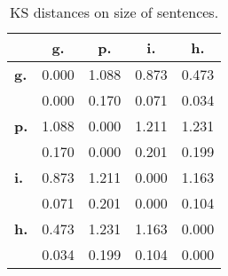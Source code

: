 \begin{table}[h!]
\begin{center}
\begin{tabular}{| l || c | c | c | c |}\hline
 & {\bf g.} & {\bf p.} & {\bf i.} & {\bf h.} \\\hline\hline
{\bf g.} & 0.000 & 1.088 & 0.873 & 0.473 \\
{\bf } & 0.000 & 0.170 & 0.071 & 0.034 \\\hline
{\bf p.} & 1.088 & 0.000 & 1.211 & 1.231 \\
{\bf } & 0.170 & 0.000 & 0.201 & 0.199 \\\hline
{\bf i.} & 0.873 & 1.211 & 0.000 & 1.163 \\
{\bf } & 0.071 & 0.201 & 0.000 & 0.104 \\\hline
{\bf h.} & 0.473 & 1.231 & 1.163 & 0.000 \\
{\bf } & 0.034 & 0.199 & 0.104 & 0.000 \\\hline
\end{tabular}
\caption{KS distances on size of sentences.}
\end{center}
\end{table}